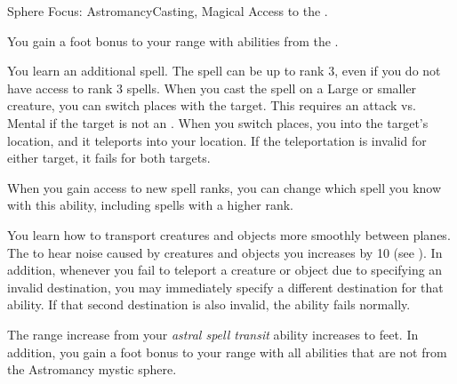     \begin{magicalfeat}{Sphere Focus: Astromancy}{Casting, Magical}
        \featpre Access to the  .

         You gain a  foot bonus to your range with abilities from the  .

         You learn an additional  spell.
        The spell can be up to rank 3, even if you do not have access to rank 3 spells.
        When you cast the spell on a Large or smaller creature, you can switch places with the target.
        This requires an attack vs. Mental if the target is not an .
        When you switch places, you  into the target's location, and it teleports into your location.
        If the teleportation is invalid for either target, it fails for both targets.

        When you gain access to new spell ranks, you can change which spell you know with this ability, including spells with a higher rank.

         You learn how to transport creatures and objects more smoothly between planes.
        The  to hear noise caused by creatures and objects you  increases by 10 (see ).
        In addition, whenever you fail to teleport a creature or object due to specifying an invalid destination, you may immediately specify a different destination for that ability.
        If that second destination is also invalid, the ability fails normally.

         The range increase from your \textit{astral spell transit} ability increases to  feet.
        In addition, you gain a  foot bonus to your range with all \magical abilities that are not from the Astromancy mystic sphere.
    \end{magicalfeat}

